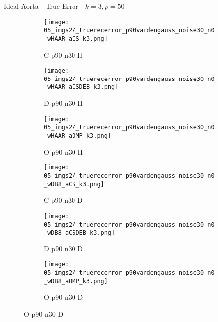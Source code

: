 \begin{frame}{Ideal Aorta - True Error - $k=3,p=50$}{}
\begin{figure}
\begin{subfigure}{0.13\textwidth}
\texttt{[image: 05\_imgs2/\_truerecerror\_p90vardengauss\_noise30\_n0\_wHAAR\_aCS\_k3.png]}
\caption*{\tiny C p90 n30 H}
\end{subfigure}
\begin{subfigure}{0.13\textwidth}
\texttt{[image: 05\_imgs2/\_truerecerror\_p90vardengauss\_noise30\_n0\_wHAAR\_aCSDEB\_k3.png]}
\caption*{\tiny D p90 n30 H}
\end{subfigure}
\begin{subfigure}{0.13\textwidth}
\texttt{[image: 05\_imgs2/\_truerecerror\_p90vardengauss\_noise30\_n0\_wHAAR\_aOMP\_k3.png]}
\caption*{\tiny O p90 n30 H}
\end{subfigure}
\begin{subfigure}{0.13\textwidth}
\texttt{[image: 05\_imgs2/\_truerecerror\_p90vardengauss\_noise30\_n0\_wDB8\_aCS\_k3.png]}
\caption*{\tiny C p90 n30 D}
\end{subfigure}
\begin{subfigure}{0.13\textwidth}
\texttt{[image: 05\_imgs2/\_truerecerror\_p90vardengauss\_noise30\_n0\_wDB8\_aCSDEB\_k3.png]}
\caption*{\tiny D p90 n30 D}
\end{subfigure}
\begin{subfigure}{0.13\textwidth}
\texttt{[image: 05\_imgs2/\_truerecerror\_p90vardengauss\_noise30\_n0\_wDB8\_aOMP\_k3.png]}
\caption*{\tiny O p90 n30 D}
\end{subfigure}
\end{figure}
\end{frame}


